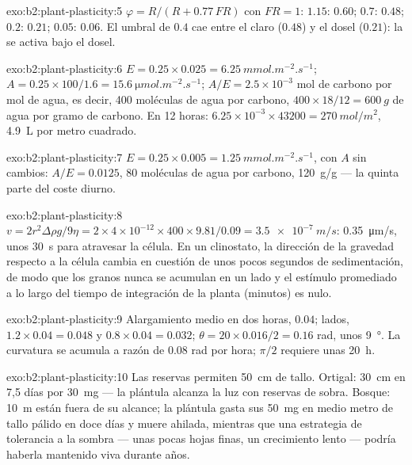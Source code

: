 \begin{solution}{exo:b2:plant-plasticity:5}
$\varphi = R/(R + 0.77\,FR)$ con $FR = 1$: $1.15$: $0.60$; $0.7$:
$0.48$; $0.2$: $0.21$; $0.05$: $0.06$. El umbral de $0.4$ cae entre el
claro ($0.48$) y el dosel ($0.21$): la  se activa
bajo el dosel.
\end{solution}

\begin{solution}{exo:b2:plant-plasticity:6}
$E = 0.25\times 0.025 = \qty{6.25}{mmol.m^{-2}.s^{-1}}$; $A =
0.25\times 100/1.6 = \qty{15.6}{\micro mol.m^{-2}.s^{-1}}$; $A/E =
2.5\times 10^{-3}$ mol de carbono por mol de agua, es decir, 400 moléculas
de agua por carbono, $400\times 18/12 = \qty{600}{g}$ de agua por gramo de
carbono. En 12 horas: $6.25\times 10^{-3}\times 43200 =
\qty{270}{mol/m^2}$, \qty{4.9}{L} por metro cuadrado.
\end{solution}

\begin{solution}{exo:b2:plant-plasticity:7}
$E = 0.25\times 0.005 = \qty{1.25}{mmol.m^{-2}.s^{-1}}$, con $A$
sin cambios: $A/E = 0.0125$, 80 moléculas de agua por carbono,
\qty{120}{g/g} --- la quinta parte del coste diurno.
\end{solution}

\begin{solution}{exo:b2:plant-plasticity:8}
$v = 2r^{2}\Delta\rho g/9\eta = 2\times 4\times 10^{-12}\times
400\times 9.81/0.09 = \qty{3.5e-7}{m/s}$: \qty{0.35}{\micro m/s},
unos \qty{30}{s} para atravesar la célula. En un clinostato, la dirección
de la gravedad respecto a la célula cambia en cuestión de unos pocos
segundos de sedimentación, de modo que los granos nunca se acumulan en un
lado y el estímulo promediado a lo largo del tiempo de integración de la
planta (minutos) es nulo.
\end{solution}

\begin{solution}{exo:b2:plant-plasticity:9}
Alargamiento medio en dos horas, $0.04$; lados, $1.2\times 0.04 = 0.048$
y $0.8\times 0.04 = 0.032$; $\theta = 20\times 0.016/2 = 0.16$
rad, unos \qty{9}{\degree}. La curvatura se acumula a razón de $0.08$ rad
por hora; $\pi/2$ requiere unas \qty{20}{h}.
\end{solution}

\begin{solution}{exo:b2:plant-plasticity:10}
Las reservas permiten \qty{50}{cm} de tallo. Ortigal: \qty{30}{cm} en
7,5 días por \qty{30}{mg} --- la plántula alcanza la luz con reservas de
sobra. Bosque: \qty{10}{m} están fuera de su alcance; la plántula gasta sus
\qty{50}{mg} en medio metro de tallo pálido en doce días y muere
ahilada, mientras que una estrategia de tolerancia a la sombra --- unas
pocas hojas finas, un crecimiento lento --- podría haberla mantenido viva
durante años.
\end{solution}

